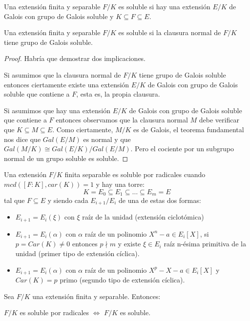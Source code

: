 \begin{definition}
Una extensión finita y separable $F/K$ es soluble si hay una extensión $E/K$ de Galois con grupo de Galois soluble y $K \subseteq F \subseteq E$.
\end{definition}

\begin{proposition}
Una extensión finita y separable $F/K$ es soluble si la clausura normal de $F/K$ tiene grupo de Galois soluble. 
\end{proposition}
\begin{proof}
Habría que demostrar dos implicaciones. 

Si asumimos que la clausura normal de $F/K$ tiene grupo de Galois soluble entonces ciertamente existe una extensión $E/K$ de Galois con grupo de Galois soluble que contiene a $F$, esta es, la propia clausura. 

Si asumimos que hay una extensión $E/K$ de Galois con grupo de Galois soluble que contiene a $F$ entonces observamos que la clausura normal $M$ debe verificar que $K \subseteq M \subseteq E$. Como ciertamente, $M/K$ es de Galois, el teorema fundamental nos dice que $Gal(E/M)$ es normal y que $Gal(M/K) \cong Gal(E/K)/Gal(E/M)$. Pero el cociente por un subgrupo normal de un grupo soluble es soluble. 
\end{proof}

\begin{definition}
Una extensión $F/K$ finita separable es soluble por radicales cuando $mcd([F:K],car(K)) = 1$ y hay una torre: $$K = E_0 \subseteq E_1 \subseteq \ldots \subseteq E_m = E$$ tal que $F \subseteq E$ y siendo cada $E_{i+1}/E_i$ de una de estas dos formas:

\begin{itemize}
\item $E_{i+1} = E_i(\xi)$ con $\xi$ raíz de la unidad (extensión ciclotómica)
\item $E_{i+1} = E_i(\alpha)$ con $\alpha$ raíz de un polinomio $X^n-a \in E_i[X]$, si $p = Car(K) \neq 0$ entonces $p \nmid m$ y existe $\xi \in E_i$ raíz n-ésima primitiva de la unidad (primer tipo de extensión cíclica).
\item $E_{i+1} = E_i(\alpha)$ con $\alpha$ raíz de un polinomio $X^p - X -a \in E_i[X]$ y $Car(K) = p$ primo (segundo tipo de extensión cíclica).
\end{itemize}
\end{definition}

\begin{theorem}
Sea $F/K$ una extensión finita y separable. Entonces:

$F/K$ es soluble por radicales $\iff$ $F/K$ es soluble. 
\end{theorem}


